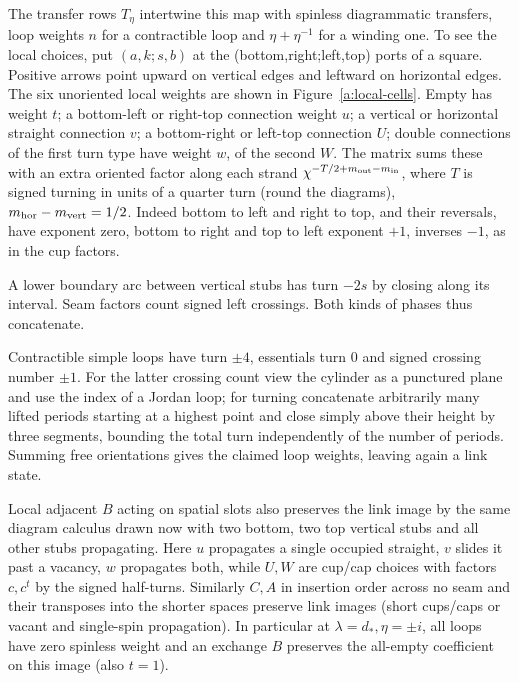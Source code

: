 The transfer rows \(T_\eta\) intertwine this map with spinless diagrammatic transfers, loop weights \(n\) for a contractible loop and \(\eta+\eta^{-1}\) for a winding one. To see the local choices, put \((a,k;s,b)\) at the
(bottom,right;left,top) ports of a square. Positive arrows point upward on
vertical edges and leftward on horizontal edges. The six unoriented local
weights are shown in Figure~\ref{a:local-cells}. Empty has weight \(t\); a bottom-left or right-top connection weight \(u\); a vertical or horizontal straight connection \(v\); a bottom-right or left-top connection \(U\); double connections of the first turn type have weight \(w\), of the second \(W\). The matrix sums these with an extra oriented factor along each strand
\(\chi^{-T/2+m_{\rm out}-m_{\rm in}}\), where \(T\) is signed turning in units of a quarter turn (round the diagrams), \(m_{\rm hor}-m_{\rm vert}=1/2\). Indeed bottom to left and right to top, and their reversals, have exponent zero, bottom to right and top to left exponent \(+1\), inverses \(-1\), as in the cup factors.

A lower boundary arc between vertical stubs has turn \(-2s\) by closing along its interval. Seam factors count signed left crossings. Both kinds of phases thus concatenate.

Contractible simple loops have turn \(\pm4\), essentials turn 0 and signed crossing number \(\pm1\). For the latter crossing count view the cylinder as a punctured plane and use the index of a Jordan loop; for turning concatenate arbitrarily many lifted periods starting at a highest point and close simply above their height by three segments, bounding the total turn independently of the number of periods. Summing free orientations gives the claimed loop weights, leaving again a link state.



Local adjacent \(B\) acting on spatial slots also preserves the link image by the same diagram calculus drawn now with two bottom, two top vertical stubs and all other stubs propagating. Here \(u\) propagates a single occupied straight, \(v\) slides it past a vacancy, \(w\) propagates both, while \(U,W\) are cup/cap choices with factors \(c,c^t\) by the signed half-turns. Similarly \(C,A\) in insertion order across no seam and their transposes into the shorter spaces preserve link images (short cups/caps or vacant and single-spin propagation). In particular at \(\lambda=d_*,\eta=\pm i\), all loops have zero spinless weight and an exchange \(B\) preserves the all-empty coefficient on this image (also \(t=1\)).

